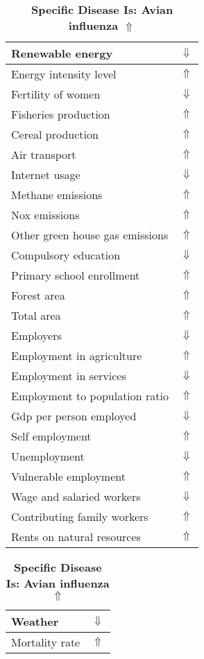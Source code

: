 \documentclass[12pt,notitlepage,oneside]{report}
\begin{document}
\clearpage
\begin{table}[!htb]
\caption{\textbf{Specific Disease Is: Avian influenza $\Uparrow$}}
\centering
\label{Correlated Socio-economic Factors0}
\begin{tabular}{|l|l|}
\hline
Renewable energy & $\Downarrow$\\ \hline
Energy intensity level & $\Uparrow$\\ \hline
Fertility of women & $\Downarrow$\\ \hline
Fisheries production & $\Uparrow$\\ \hline
Cereal production & $\Uparrow$\\ \hline
Air transport  & $\Uparrow$\\ \hline
Internet usage & $\Downarrow$\\ \hline
Methane emissions & $\Uparrow$\\ \hline
Nox emissions & $\Uparrow$\\ \hline
Other green house gas emissions & $\Uparrow$\\ \hline
Compulsory education & $\Downarrow$\\ \hline
Primary school enrollment & $\Uparrow$\\ \hline
Forest area & $\Uparrow$\\ \hline
Total area & $\Uparrow$\\ \hline
Employers & $\Downarrow$\\ \hline
Employment in agriculture & $\Uparrow$\\ \hline
Employment in services & $\Downarrow$\\ \hline
Employment to population ratio & $\Uparrow$\\ \hline
Gdp per person employed & $\Downarrow$\\ \hline
Self employment & $\Uparrow$\\ \hline
Unemployment & $\Downarrow$\\ \hline
Vulnerable employment & $\Uparrow$\\ \hline
Wage and salaried workers & $\Downarrow$\\ \hline
Contributing family workers & $\Uparrow$\\ \hline
Rents on natural resources & $\Uparrow$\\ \hline
\end{tabular}
\begin{tabular}{|l|l|}
\hline
Weather & $\Downarrow$\\ \hline
Mortality rate & $\Uparrow$\\ \hline

\end{tabular}
\end{table}
\end{document}

